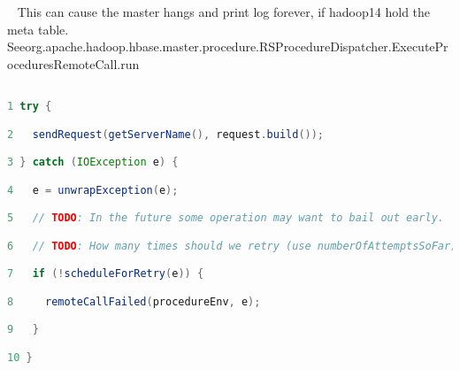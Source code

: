 \documentclass{report}%
\begin{document}
\begin{enumerate}
\begin{lstlisting}[language=java]
\end{lstlisting} \ \newline%
\newline%
\newline%
\newline%
\newline%
\newline%
This can cause the master hangs and print log forever, if hadoop14 hold the meta table.\newline%
\newline%
\newline%
\newline%
Seeorg.apache.hadoop.hbase.master.procedure.RSProcedureDispatcher.ExecuteProceduresRemoteCall.run\newline%
\newline%
\begin{lstlisting}[language=java]

1 try {

2   sendRequest(getServerName(), request.build());

3 } catch (IOException e) {

4   e = unwrapException(e);

5   // TODO: In the future some operation may want to bail out early.

6   // TODO: How many times should we retry (use numberOfAttemptsSoFar)

7   if (!scheduleForRetry(e)) {

8     remoteCallFailed(procedureEnv, e);

9   }

10 }


\end{lstlisting}
\end{enumerate}
\end{document}
